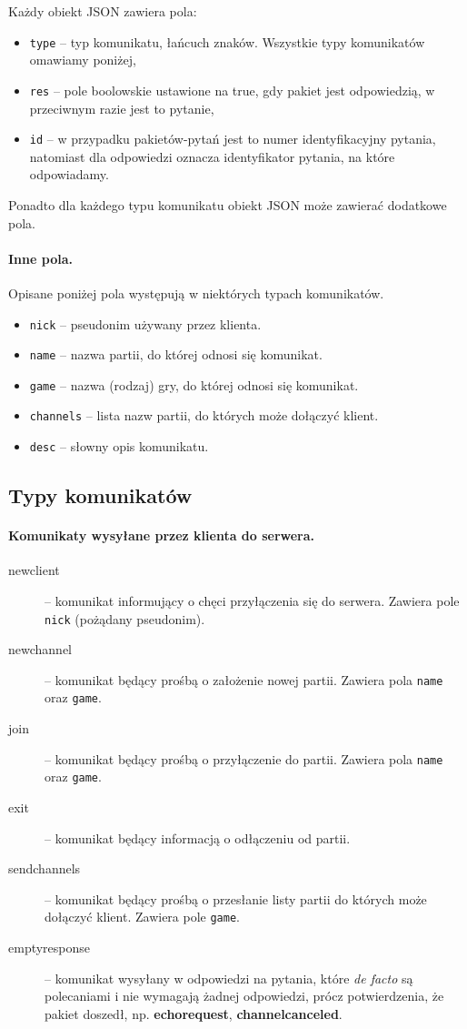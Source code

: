 \documentclass[a4paper, 12pt]{article}
\begin{document}
Każdy obiekt JSON zawiera pola:
\begin{itemize}
 \item \texttt{type} -- typ komunikatu, łańcuch znaków. Wszystkie typy komunikatów omawiamy poniżej,
 \item \texttt{res} -- pole boolowskie ustawione na true, gdy pakiet jest odpowiedzią, w przeciwnym razie jest to pytanie,
 \item \texttt{id} -- w przypadku pakietów-pytań jest to numer identyfikacyjny pytania, natomiast dla odpowiedzi oznacza identyfikator pytania, na które odpowiadamy.
\end{itemize}
Ponadto dla każdego typu komunikatu obiekt JSON może zawierać dodatkowe pola.

\paragraph{Inne pola.} Opisane poniżej pola występują w niektórych typach komunikatów.
\begin{itemize}
 \item \texttt{nick} -- pseudonim używany przez klienta.
 \item \texttt{name} -- nazwa partii, do której odnosi się komunikat.
 \item \texttt{game} -- nazwa (rodzaj) gry, do której odnosi się komunikat.
 \item \texttt{channels} -- lista nazw partii, do których może dołączyć klient. 
 \item \texttt{desc} -- słowny opis komunikatu.
\end{itemize}

\subsection{Typy komunikatów}
\paragraph{Komunikaty wysyłane przez klienta do serwera.}
\begin{description}
 \item[newclient] -- komunikat informujący o chęci przyłączenia się do serwera. Zawiera pole \texttt{nick} (pożądany pseudonim).
 \item[newchannel] -- komunikat będący prośbą o założenie nowej partii. Zawiera pola \texttt{name} oraz \texttt{game}.
 \item[join] -- komunikat będący prośbą o przyłączenie do partii. Zawiera pola \texttt{name} oraz \texttt{game}.
 \item[exit] -- komunikat będący informacją o odłączeniu od partii.
 \item[sendchannels] -- komunikat będący prośbą o przesłanie listy partii do których może dołączyć klient. Zawiera pole \texttt{game}.
 \item[emptyresponse] -- komunikat wysyłany w odpowiedzi na pytania, które \textit{de facto} są polecaniami i nie wymagają żadnej odpowiedzi, prócz potwierdzenia, że pakiet doszedł, np. \textbf{echorequest}, \textbf{channelcanceled}.
\end{description}
\end{document}

